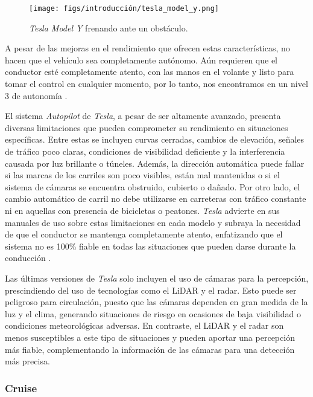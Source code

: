 \begin{figure}[ht]
\begin{center}
\texttt{[image: figs/introducción/tesla\_model\_y.png]}
\end{center}
\caption{\textit{Tesla Model Y} frenando ante un obstáculo.}
\label{fig:tesla}
\end{figure}

A pesar de las mejoras en el rendimiento que ofrecen estas características, no hacen que el vehículo sea completamente autónomo. Aún requieren que el conductor esté completamente atento, con las manos en el volante y listo para tomar el control en cualquier momento, por lo tanto, nos encontramos en un nivel 3 de autonomía \cite{tesla-autopilot}.

El sistema \textit{Autopilot} de \textit{Tesla}, a pesar de ser altamente avanzado, presenta diversas limitaciones que pueden comprometer su rendimiento en situaciones específicas. Entre estas se incluyen curvas cerradas, cambios de elevación, señales de tráfico poco claras, condiciones de visibilidad deficiente y la interferencia causada por luz brillante o túneles. Además, la dirección automática puede fallar si las marcas de los carriles son poco visibles, están mal mantenidas o si el sistema de cámaras se encuentra obstruido, cubierto o dañado. Por otro lado, el cambio automático de carril no debe utilizarse en carreteras con tráfico constante ni en aquellas con presencia de bicicletas o peatones. \textit{Tesla} advierte en sus manuales de uso sobre estas limitaciones en cada modelo y subraya la necesidad de que el conductor se mantenga completamente atento, enfatizando que el sistema no es 100\% fiable en todas las situaciones que pueden darse durante la conducción \cite{tesla-limitations}.

Las últimas versiones de \textit{Tesla} solo incluyen el uso de cámaras para la percepción, prescindiendo del uso de tecnologías como el \ac{LiDAR} y el radar. Esto puede ser peligroso para circulación, puesto que las cámaras dependen en gran medida de la luz y el clima, generando situaciones de riesgo en ocasiones de baja visibilidad o condiciones meteorológicas adversas. En contraste, el \ac{LiDAR} y el radar son menos susceptibles a este tipo de situaciones y pueden aportar una percepción más fiable, complementando la información de las cámaras para una detección más precisa.

\subsubsection{Cruise}

